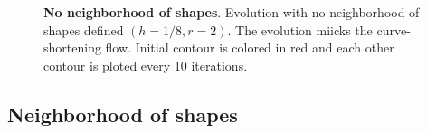 \documentclass[smallextended]{svjour3}
\begin{document}
\begin{figure}
	\caption{\textbf{No neighborhood of shapes}. Evolution with no neighborhood of shapes defined $(h=1/8,r=2)$. The evolution miicks the curve-shortening flow. Initial contour is colored in red and each other contour is ploted every 10 iterations.}
	\label{fig:no-neighborhood-shapes-evolution}
\end{figure}
%
%
%

\subsection{Neighborhood of shapes}
\end{document}
